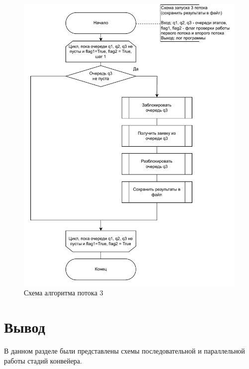 \begin{figure}[h]
	\centering
	\includegraphics[scale=0.8]{photos/thread3}
	\caption{Схема алгоритма потока 3}
	\label{sh3}
\end{figure}


\section*{Вывод}

В данном разделе были представлены схемы последовательной и параллельной работы стадий конвейера.